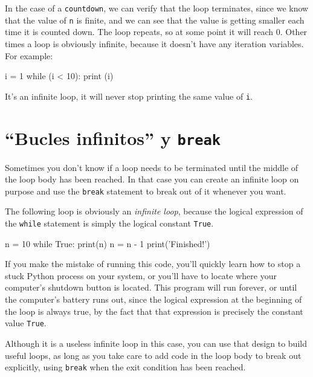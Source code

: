  

In the case of a \texttt{countdown}, we can verify that the loop terminates, since we know that the value of \texttt{n} is finite, and we can see that the value is getting smaller each time it is counted down. The loop repeats, so at some point it will reach 0. Other times a loop is obviously infinite, because it doesn't have any iteration variables. For example:

\begin{python}[frame=single]
i = 1
while (i < 10):
    print (i)
\end{python}

It's an infinite loop, it will never stop printing the same value of \verb|i|.





\hypertarget{bucles-infinitos-y-break}{%
\section{\texorpdfstring{``Bucles infinitos'' y
\texttt{break}}{``Infinite loops'' and break}}\label{bucles-infinitos-y-break}}

 

Sometimes you don't know if a loop needs to be terminated until the middle of the loop body has been reached. In that case you can create an infinite loop on purpose and use the \texttt{break} statement to break out of it whenever you want.

The following loop is obviously an \emph{infinite loop}, because the logical expression of the \texttt{while} statement is simply the logical constant \texttt{True}.

\begin{python}[frame=single]
n = 10
while True:
    print(n)
    n = n - 1
print('Finished!')
\end{python}

If you make the mistake of running this code, you'll quickly learn how to stop a stuck Python process on your system, or you'll have to locate where your computer's shutdown button is located. This program will run forever, or until the computer's battery runs out, since the logical expression at the beginning of the loop is always true, by the fact that that expression is precisely the constant value \texttt{True}.

Although it is a useless infinite loop in this case, you can use that design to build useful loops, as long as you take care to add code in the loop body to break out explicitly, using \texttt{break} when the exit condition has been reached.

